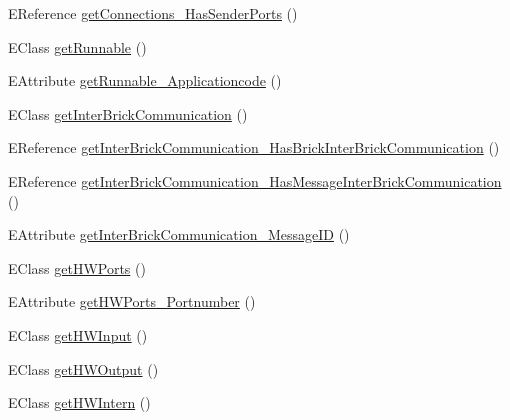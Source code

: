 \begin{DoxyCompactItemize}
\item 
E\-Reference \hyperlink{interfaceshootingmachineemfmodel_1_1_shootingmachineemfmodel_package_ab245415cfc1d1656deee570eb4d4b8c1}{get\-Connections\-\_\-\-Has\-Sender\-Ports} ()
\item 
E\-Class \hyperlink{interfaceshootingmachineemfmodel_1_1_shootingmachineemfmodel_package_a65dad4ef70cda2d24fe685c2da5a894c}{get\-Runnable} ()
\item 
E\-Attribute \hyperlink{interfaceshootingmachineemfmodel_1_1_shootingmachineemfmodel_package_a497701a2cbe3b3a45fcb9c9db7c60617}{get\-Runnable\-\_\-\-Applicationcode} ()
\item 
E\-Class \hyperlink{interfaceshootingmachineemfmodel_1_1_shootingmachineemfmodel_package_a07ac73133496e66edfbf6580ef5e8072}{get\-Inter\-Brick\-Communication} ()
\item 
E\-Reference \hyperlink{interfaceshootingmachineemfmodel_1_1_shootingmachineemfmodel_package_a3b1a90e9eb6a233cefb76bbf169cf0a4}{get\-Inter\-Brick\-Communication\-\_\-\-Has\-Brick\-Inter\-Brick\-Communication} ()
\item 
E\-Reference \hyperlink{interfaceshootingmachineemfmodel_1_1_shootingmachineemfmodel_package_a93121471ccbb4baa4b87e67543b85dc9}{get\-Inter\-Brick\-Communication\-\_\-\-Has\-Message\-Inter\-Brick\-Communication} ()
\item 
E\-Attribute \hyperlink{interfaceshootingmachineemfmodel_1_1_shootingmachineemfmodel_package_a91c0d467979c6de78aae8b3b31741fc6}{get\-Inter\-Brick\-Communication\-\_\-\-Message\-I\-D} ()
\item 
E\-Class \hyperlink{interfaceshootingmachineemfmodel_1_1_shootingmachineemfmodel_package_a61f991dc891f5f2bb2bed180315251ca}{get\-H\-W\-Ports} ()
\item 
E\-Attribute \hyperlink{interfaceshootingmachineemfmodel_1_1_shootingmachineemfmodel_package_aed948671ec22a9979acaf83742119868}{get\-H\-W\-Ports\-\_\-\-Portnumber} ()
\item 
E\-Class \hyperlink{interfaceshootingmachineemfmodel_1_1_shootingmachineemfmodel_package_a300f22d97187e71008e38fcdc44814bc}{get\-H\-W\-Input} ()
\item 
E\-Class \hyperlink{interfaceshootingmachineemfmodel_1_1_shootingmachineemfmodel_package_a2af0244950d949bae77dfe7e98015249}{get\-H\-W\-Output} ()
\item 
E\-Class \hyperlink{interfaceshootingmachineemfmodel_1_1_shootingmachineemfmodel_package_a44d43825d205aa22ca7b8ac2cfaef00d}{get\-H\-W\-Intern} ()
\item 

\end{DoxyCompactItemize}
